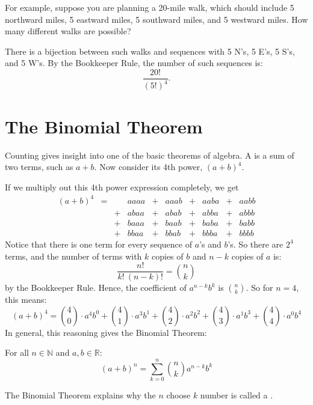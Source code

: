For example, suppose you are planning a 20-mile walk, which should
include 5 northward miles, 5 eastward miles, 5 southward miles, and 5
westward miles.  How many different walks are possible?

There is a bijection between such walks and sequences with 5 N's, 5
E's, 5 S's, and 5 W's.  By the Bookkeeper Rule, the number of such
sequences is:
\[
    \frac{20!}{(5!)^4}.
\]

\begin{problems}
\examproblems
{}
\end{problems}


\section{The Binomial Theorem}\label{binomial_theorem_sec}

Counting gives insight into one of the basic theorems of algebra.  A
 is a sum of two terms, such as $a + b$.  Now consider its
4th power, $(a + b)^4$.

If we multiply out this 4th power expression completely, we get
\[\begin{array}{rccccccccc}
(a + b)^4
   & = &    & aaaa & + & aaab & + & aaba & + & aabb \\
   &   &  + & abaa & + & abab & + & abba & + & abbb \\
   &   &  + & baaa & + & baab & + & baba & + & babb \\
   &   &  + & bbaa & + & bbab & + & bbba & + & bbbb
\end{array}\]
Notice that there is one term for every sequence of $a$'s and $b$'s.  So
there are $2^4$ terms, and the number of terms with $k$ copies of $b$ and
$n - k$ copies of $a$ is:
\[
\frac{n!}{k!\ (n-k)!} = \binom{n}{k}
\]
by the Bookkeeper Rule.  Hence, the coefficient of $a^{n-k} b^k$ is
$\binom{n}{k}$.  So for $n = 4$, this means:
\[
(a + b)^4 =
    \binom{4}{0} \cdot a^4 b^0 +
    \binom{4}{1} \cdot a^3 b^1 +
    \binom{4}{2} \cdot a^2 b^2 +
    \binom{4}{3} \cdot a^1 b^3 +
    \binom{4}{4} \cdot a^0 b^4
\]
In general, this reasoning gives the Binomial Theorem:

\begin{theorem}
For all $n \in \mathbb{N}$ and $a, b \in \mathbb{R}$:
%
\[
(a + b)^n = \sum_{k=0}^n \binom{n}{k} a^{n-k} b^k
\]
\end{theorem}
The Binomial Theorem explains why the $n$ choose $k$ number is called
a .


